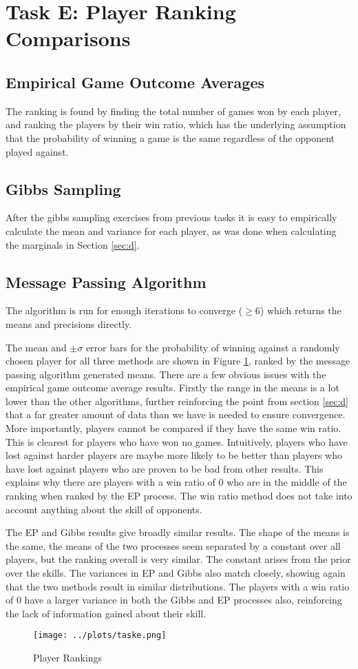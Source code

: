 \documentclass[11pt]{amsart}
\begin{document}
\section{Task E: Player Ranking Comparisons} \label{sec:e}
\subsection{Empirical Game Outcome Averages}
The ranking is found by finding the total number of games won by each player, and ranking the players by their win ratio, which has the underlying assumption that the probability of winning a game is the same regardless of the opponent played against.
\subsection{Gibbs Sampling}
After the gibbs sampling exercises from previous tasks it is easy to empirically calculate the mean and variance for each player, as was done when calculating the marginals in Section \ref{sec:d}.
\subsection{Message Passing Algorithm}
The algorithm is run for enough iterations to converge ($\geq 6$) which returns the means and precisions directly.

The mean and $\pm\sigma$ error bars for the probability of winning against a randomly chosen player for all three methods are shown in Figure \ref{fig:te}, ranked by the message passing algorithm generated means. There are a few obvious issues with the empirical game outcome average results. Firstly the range in the means is a lot lower than the other algorithms, further reinforcing the point from section \ref{sec:d} that a far greater amount of data than we have is needed to ensure convergence. More importantly, players cannot be compared if they have the same win ratio. This is clearest for players who have won no games. Intuitively, players who have lost against harder players are maybe more likely to be better than players who have lost against players who are proven to be bad from other results. This explains why there are players with a win ratio of 0 who are in the middle of the ranking when ranked by the EP process. The win ratio method does not take into account anything about the skill of opponents.

The EP and Gibbs results give broadly similar results. The shape of the means is the same, the means of the two processes seem separated by a constant over all players, but the ranking overall is very similar. The constant arises from the prior over the skills. The variances in EP and Gibbs also match closely, showing again that the two methods result in similar distributions. The players with a win ratio of 0 have a larger variance in both the Gibbs and EP processes also, reinforcing the lack of information gained about their skill.
\begin{figure}[]
    \centering
    \texttt{[image: ../plots/taske.png]}
    \caption{Player Rankings}
    \label{fig:te}
\end{figure}
\end{document}
